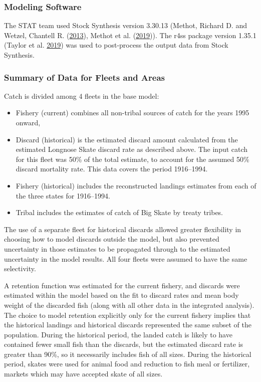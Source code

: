 \documentclass[12pt,]{article}
\begin{document}
\hypertarget{modeling-software}{%
\subsubsection{Modeling Software}\label{modeling-software}}

The STAT team used Stock Synthesis version 3.30.13 (Methot, Richard D.
and Wetzel, Chantell R. (\protect\hyperlink{ref-Methot2013}{2013}),
Methot et al. (\protect\hyperlink{ref-Methot2019}{2019})). The r4ss
package version 1.35.1 (Taylor et al.
\protect\hyperlink{ref-Taylor2019}{2019}) was used to post-process the
output data from Stock Synthesis.

\hypertarget{summary-of-data-for-fleets-and-areas}{%
\subsubsection{Summary of Data for Fleets and
Areas}\label{summary-of-data-for-fleets-and-areas}}

Catch is divided among 4 fleets in the base model:

\begin{itemize}
\item Fishery (current) combines all non-tribal sources of catch for the years 1995 onward,
\item Discard (historical) is the estimated discard amount calculated from the estimated Longnose Skate discard rate as described above. The input catch for this fleet was 50\% of the total estimate, to account for the assumed 50\% discard mortality rate. This data covers the period 1916--1994.
\item Fishery (historical) includes the reconstructed landings estimates from each of the three states for 1916--1994.
\item Tribal includes the estimates of catch of Big Skate by treaty tribes.
\end{itemize}

The use of a separate fleet for historical discards allowed greater
flexibility in choosing how to model discards outside the model, but
also prevented uncertainty in those estimates to be propagated through
to the estimated uncertainty in the model results. All four fleets were
assumed to have the same selectivity.

A retention function was estimated for the current fishery, and discards
were estimated within the model based on the fit to discard rates and
mean body weight of the discarded fish (along with all other data in the
integrated analysis). The choice to model retention explicitly only for
the current fishery implies that the historical landings and historical
discards represented the same subset of the population. During the
historical period, the landed catch is likely to have contained fewer
small fish than the discards, but the estimated discard rate is greater
than 90\%, so it necessarily includes fish of all sizes. During the
historical period, skates were used for animal food and reduction to
fish meal or fertilizer, markets which may have accepted skate of all
sizes.
\end{document}

